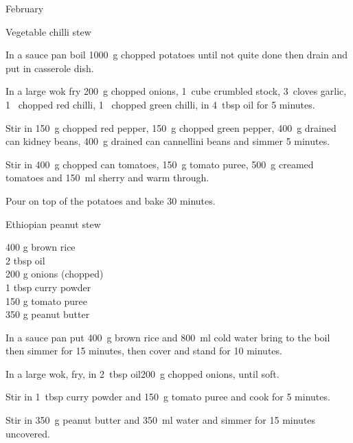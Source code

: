 \begin{menu}{February}
\begin{recipe}{2}{Vegetable chilli stew}
    \begin{instructions}
    \item 
        In a sauce pan boil
        1000~g chopped potatoes
        until not quite done
        then drain and put in casserole dish.
      \item 
        In a large wok fry
        200~g chopped onions,
        1~cube crumbled stock,
        3~cloves  garlic,
        1~ chopped red chilli,
        1~ chopped green chilli,
        in
        4~tbsp  oil
        for 5 minutes.
      \item 
        Stir in
        150~g chopped red pepper,
        150~g chopped green pepper,
        400~g drained can kidney beans,
        400~g drained can cannellini beans
        and simmer 5 minutes.
      \item 
        Stir in
        400~g chopped can tomatoes,
        150~g  tomato puree,
        500~g  creamed tomatoes
        and
        150~ml  sherry
        and warm through.
      \item 
        Pour on top of the potatoes
        and bake 30 minutes.
      
    \end{instructions}
    \end{recipe}%
  
    \begin{recipe}{2}{Ethiopian peanut stew}%
    
		\begin{ingredients}
		400 g brown rice  \\
	2 tbsp oil  \\
	200 g onions (chopped) \\
	1 tbsp curry powder  \\
	150 g tomato puree  \\
	350 g peanut butter  \\
	
		\end{ingredients}
	
    \begin{instructions}
    \item 
      In a
      sauce pan
      put
      400~g  brown rice
      and
      800~ml  cold water
      bring to the boil then simmer for 15 minutes,
      then cover and stand for 10 minutes.
    \item 
        In a large wok,
        fry,
        in 2~tbsp  oil200~g chopped onions,
        until soft.
      \item 
        Stir in
        1~tbsp  curry powder
        and
        150~g  tomato puree
        and cook for 5 minutes.
      \item 
        Stir in
        350~g  peanut butter
        and
        350~ml  water
        and simmer for 15 minutes uncovered.
      

\end{instructions}
\end{recipe}
\end{menu}
